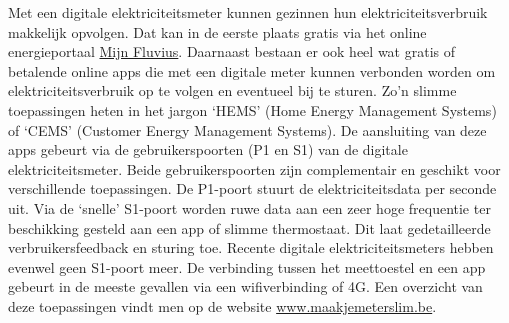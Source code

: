Met een digitale elektriciteitsmeter kunnen gezinnen hun elektriciteitsverbruik makkelijk opvolgen. Dat kan in de eerste plaats gratis via het online energieportaal \href{https://login.fluvius.be/klanten.onmicrosoft.com/b2c_1a_customer_signup_signin/oauth2/v2.0/authorize?client_id=91bb9a0a-f45d-491a-ae0b-43324fbc343a&scope=openid%20profile%20offline_access&redirect_uri=https%3A%2F%2Fmijn.fluvius.be%2Fredirect&client-request-id=90c12c72-7d7b-428b-98fc-5d7956e53a60&response_mode=fragment&response_type=code&x-client-SKU=msal.js.browser&x-client-VER=2.23.0&client_info=1&code_challenge=jz-1E8AwB15UEa352eC_5x6zDtAtwp3Je6jrFVdGKjk&code_challenge_method=S256&nonce=cee3d720-d931-4b13-b0b5-c473169ca6fd&state=eyJpZCI6IjRhM2I3M2NkLTgyZjgtNDFjOC05NzAyLTEwMTNjNjNkNjNhMyIsIm1ldGEiOnsiaW50ZXJhY3Rpb25UeXBlIjoicmVkaXJlY3QifX0%3D}{Mijn Fluvius}. Daarnaast bestaan er ook heel wat gratis of betalende online apps die met een digitale meter kunnen verbonden worden om elektriciteitsverbruik op te volgen en eventueel bij te sturen. Zo’n slimme toepassingen heten in het jargon ‘HEMS’ (Home Energy Management Systems) of ‘CEMS’ (Customer Energy Management Systems). De aansluiting van deze apps gebeurt via de gebruikerspoorten (P1 en S1) van de digitale elektriciteitsmeter. Beide gebruikerspoorten zijn complementair en geschikt voor verschillende toepassingen. De P1-poort stuurt de elektriciteitsdata per seconde uit. Via de ‘snelle’ S1-poort worden ruwe data aan een zeer hoge frequentie ter beschikking gesteld aan een app of slimme thermostaat. Dit laat gedetailleerde verbruikersfeedback en sturing toe. Recente digitale elektriciteitsmeters hebben evenwel geen S1-poort meer. De verbinding tussen het meettoestel en een app gebeurt in de meeste gevallen via een wifiverbinding of 4G. Een overzicht van deze toepassingen vindt men op de website \href{https://maakjemeterslim.be/}{www.maakjemeterslim.be}.

\section{}%
\label{sec:overzicht functionaliteiten bestaande apps}

